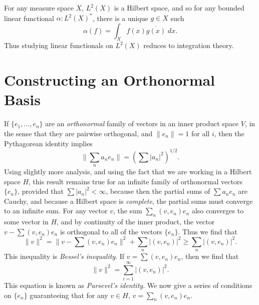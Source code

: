\begin{example}
    For any measure space $X$, $L^2(X)$ is a Hilbert space, and so for any bounded linear functional $\alpha: L^2(X)^*$, there is a unique $g \in X$ such
    \[ \alpha(f) = \int_X f(x) \overline{g(x)}\; dx. \]
    Thus studying linear functionals on $L^2(X)$ reduces to integration theory.
\end{example}

\section{Constructing an Orthonormal Basis}

If $\{ e_1, \dots, e_n \}$ are an \emph{orthonormal} family of vectors in an inner product space $V$, in the sense that they are pairwise orthogonal, and $\| e_n \| = 1$ for all $i$, then the Pythagorean identity implies
%
\[ \| \sum_n a_ne_n \| = \left( \sum |a_n|^2 \right)^{1/2}. \]
%
Using slightly more analysis, and using the fact that we are working in a Hilbert space $H$, this result remains true for an infinite family of orthonormal vectors $\{ e_n \}$, provided that $\sum |a_n|^2 < \infty$, because then the partial sums of $\sum a_n e_n$ are Cauchy, and because a Hilbert space is \emph{complete}, the partial sums must converge to an infinite sum. For any vector $v$, the sum $\sum_n (v,e_n) e_n$ also converges to some vector in $H$, and by continuity of the inner product, the vector $v - \sum (v,e_n) e_n$ is orthogonal to all of the vectors $\{ e_n \}$. Thus we find that
%
\[ \| v \|^2 = \| v - \sum (v,e_n) e_n \|^2 + \sum_n |(v,e_n)|^2 \geq \sum_n |(v,e_n)|^2. \]
%
This inequality is \emph{Bessel's inequality}. If $v = \sum (v,e_n) e_n$, then we find that
%
\[ \| v \|^2 = \sum_{i = 1}^\infty |(v,e_n)|^2. \]
%
This equation is known as {\it Parsevel's identity}. We now give a series of conditions on $\{ e_n \}$ guaranteeing that for any $v \in H$, $v = \sum_n (v,e_n) e_n$.

